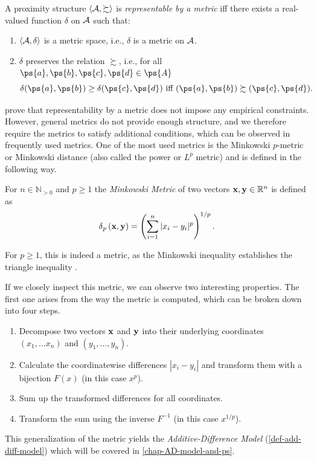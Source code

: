\begin{defi}  \label{def-representable-by-metric}
	A proximity structure $\langle \ps{A}, \succsim \rangle$ is \emph{representable by a metric} iff there exists a real-valued function $\delta$ on $\ps{A}$ such that:
	\begin{enumerate}
		\item $\langle \ps{A}, \delta \rangle$ is a metric space, i.e., $\delta$ is a metric on $\ps{A}$.
		\item $\delta$ preserves the relation $\succsim$, i.e., for all $\ps{a}, \ps{b}, \ps{c}, \ps{d} \in \ps{A}$
		      $$
			      \delta(\ps{a}, \ps{b}) \geq \delta(\ps{c}, \ps{d}) \text{ iff } (\ps{a}, \ps{b}) \succsim (\ps{c}, \ps{d}).
		      $$
	\end{enumerate}
\end{defi}
\textcite[p. 162]{foundations2} prove that representability by a metric does not impose any empirical constraints.
However, general metrics do not provide enough structure, and we therefore require the metrics to satisfy additional conditions, which can be observed in frequently used metrics.
One of the most used metrics is the Minkowski $p$-metric or Minkowski distance (also called the power or $L^p$ metric) and is defined in the following way.

\begin{defi}     \label{def-minkowski-metric} %
	For $n \in \mathbb{N}_{>0}$ and $p \geq 1$ the \emph{Minkowski Metric} of two vectors $\ve{x}, \ve{y} \in \mathbb{R}^{n}$ is defined as
	\begin{equation*}
		\metr[p]{\ve{x}}{\ve{y}} = \left ( \sum_{i=1}^{n} |x_i - y_i|^p \right)^{1/p}.
	\end{equation*}
\end{defi}

For $p \geq 1$, this is indeed a metric, as the Minkowski inequality establishes the triangle inequality \parencite[pp. 189-191 Theorem 9]{handbookMeans}. 

If we closely inspect this metric, we can observe two interesting properties.
The first one arises from the way the metric is computed, which can be broken down into four steps.
\begin{enumerate}[1.]
	\item Decompose two vectors $\ve{x}$ and $\ve{y}$ into their underlying coordinates $(x_1, \dots x_n)$ and $(y_1, \dots, y_n)$.
	\item Calculate the coordinatewise differences $|x_i - y_i|$ and transform them with a bijection $F(x)$ (in this case $x^p$).
	\item Sum up the transformed differences for all coordinates.
	\item Transform the sum using the inverse $F^{-1}$ (in this case $x^{1/p}$).
\end{enumerate}
This generalization of the metric yields the \emph{Additive-Difference Model} (\cref{def-add-diff-model}) which will be covered in \cref{chap-AD-model-and-ps}.

